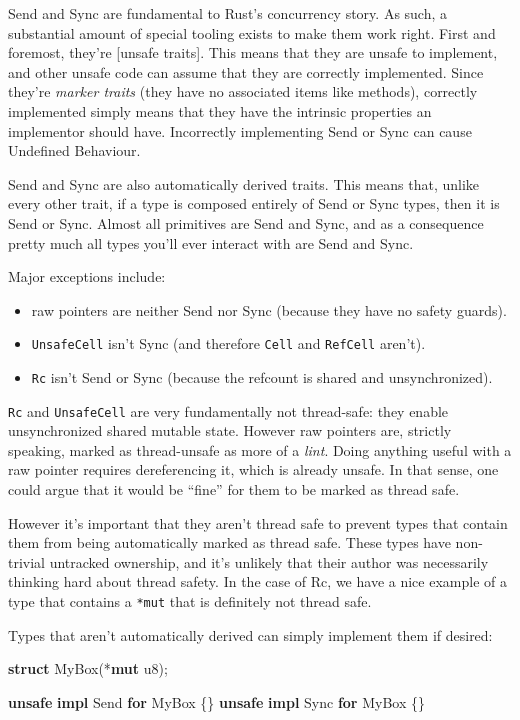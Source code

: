 \documentclass[a4paper,]{book}
\newenvironment{Shaded}{\begin{snugshade}}{\end{snugshade}}
\newcommand{\KeywordTok}[1]{\textcolor[rgb]{0.13,0.29,0.53}{\textbf{{#1}}}}
\newcommand{\DataTypeTok}[1]{\textcolor[rgb]{0.13,0.29,0.53}{{#1}}}
\newcommand{\BuiltInTok}[1]{{#1}}
\newcommand{\NormalTok}[1]{{#1}}
\providecommand{\tightlist}{%
  \setlength{\itemsep}{0pt}\setlength{\parskip}{0pt}}
\begin{document}
Send and Sync are fundamental to Rust's concurrency story. As such, a
substantial amount of special tooling exists to make them work right.
First and foremost, they're {[}unsafe traits{]}. This means that they
are unsafe to implement, and other unsafe code can assume that they are
correctly implemented. Since they're \emph{marker traits} (they have no
associated items like methods), correctly implemented simply means that
they have the intrinsic properties an implementor should have.
Incorrectly implementing Send or Sync can cause Undefined Behaviour.

Send and Sync are also automatically derived traits. This means that,
unlike every other trait, if a type is composed entirely of Send or Sync
types, then it is Send or Sync. Almost all primitives are Send and Sync,
and as a consequence pretty much all types you'll ever interact with are
Send and Sync.

Major exceptions include:

\begin{itemize}
\tightlist
\item
  raw pointers are neither Send nor Sync (because they have no safety
  guards).
\item
  \texttt{UnsafeCell} isn't Sync (and therefore \texttt{Cell} and
  \texttt{RefCell} aren't).
\item
  \texttt{Rc} isn't Send or Sync (because the refcount is shared and
  unsynchronized).
\end{itemize}

\texttt{Rc} and \texttt{UnsafeCell} are very fundamentally not
thread-safe: they enable unsynchronized shared mutable state. However
raw pointers are, strictly speaking, marked as thread-unsafe as more of
a \emph{lint}. Doing anything useful with a raw pointer requires
dereferencing it, which is already unsafe. In that sense, one could
argue that it would be ``fine'' for them to be marked as thread safe.

However it's important that they aren't thread safe to prevent types
that contain them from being automatically marked as thread safe. These
types have non-trivial untracked ownership, and it's unlikely that their
author was necessarily thinking hard about thread safety. In the case of
Rc, we have a nice example of a type that contains a \texttt{*mut} that
is definitely not thread safe.

Types that aren't automatically derived can simply implement them if
desired:

\begin{Shaded}
\begin{Highlighting}[]
\KeywordTok{struct} \NormalTok{MyBox(*}\KeywordTok{mut} \DataTypeTok{u8}\NormalTok{);}

\KeywordTok{unsafe} \KeywordTok{impl} \BuiltInTok{Send} \KeywordTok{for} \NormalTok{MyBox \{\}}
\KeywordTok{unsafe} \KeywordTok{impl} \BuiltInTok{Sync} \KeywordTok{for} \NormalTok{MyBox \{\}}
\end{Highlighting}
\end{Shaded}
\end{document}
